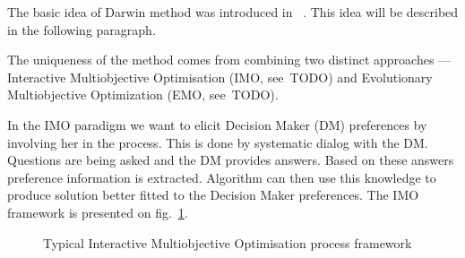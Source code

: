 The basic idea of Darwin method was introduced in~ \cite{GMS09}. This idea will
be described in the following paragraph.

The uniqueness of the method comes from combining two distinct approaches ---
Interactive Multiobjective Optimisation (IMO, see~TODO) and Evolutionary
Multiobjective Optimization (EMO, see~TODO).

In the IMO paradigm we want to elicit Decision Maker (DM) preferences by
involving her in the process. This is done by systematic dialog with the
DM. Questions are being asked and the DM provides answers. Based on these
answers preference information is extracted. Algorithm can then use this
knowledge to produce solution better fitted to the Decision Maker
preferences. The IMO framework is presented on
fig.~\ref{fig:interactive-process}.

\begin{figure} 
  \begin{center}
    \caption{Typical Interactive Multiobjective
      Optimisation process framework\label{fig:interactive-process}}
  \end{center} 
\end{figure} 



